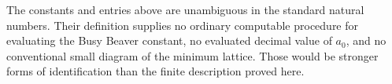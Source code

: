 The constants and entries above are unambiguous in the standard natural
numbers.  Their definition supplies no ordinary computable procedure
for evaluating the Busy Beaver constant, no evaluated decimal value
of $a_0$, and no conventional small diagram of the minimum lattice.
Those would be stronger forms of identification than the finite
description proved here.
